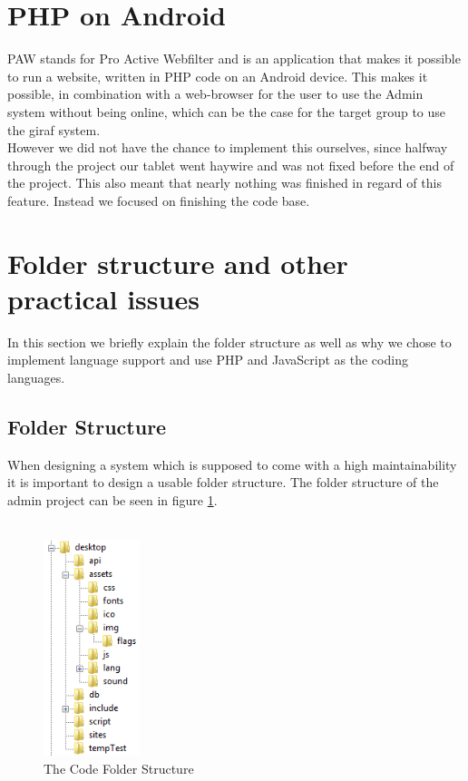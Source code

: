 \section{PHP on Android}
PAW stands for Pro Active Webfilter and is an application that makes it possible to run a website, written in PHP code on an Android device. This makes it possible, in combination with a web-browser for the user to use the Admin system without being online, which can be the case for the target group to use the \ac{giraf} system.\\
However we did not have the chance to implement this ourselves, since halfway through the project our tablet went haywire and was not fixed before the end of the project. This also meant that nearly nothing was finished in regard of this feature. Instead we focused on finishing the code base.

\section{Folder structure and other practical issues}
In this section we briefly explain the folder structure as well as why we chose to implement language support and use PHP and JavaScript as the coding languages.

\subsection{Folder Structure}
When designing a system which is supposed to come with a high maintainability it is important to design a usable folder structure. The folder structure of the admin project can be seen in figure \ref{fig:folderStructure}.\\
\\

\begin{figure}[htbp]
        \centering
                \includegraphics[width=0.25\textwidth]{images/folderStructure.png}
        \caption{The Code Folder Structure}
        \label{fig:folderStructure}
\end{figure}

